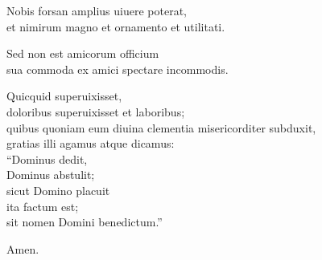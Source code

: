 \documentclass[a5paper,twoside]{article}
\begin{document}
Nobis forsan amplius uiuere poterat, \\
et nimirum magno et ornamento et utilitati.  

Sed non est amicorum officium \\
sua commoda ex amici spectare incommodis.  

Quicquid superuixisset, \\
doloribus superuixisset et laboribus; \\
quibus quoniam eum diuina clementia misericorditer subduxit, \\
gratias illi agamus atque dicamus: \\
``Dominus dedit, \\
Dominus abstulit; \\
sicut Domino placuit \\
ita factum est; \\
sit nomen Domini benedictum.'' 

Amen.


\endnumbering
\end{document}
